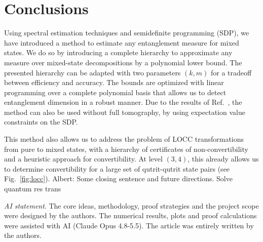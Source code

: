 \documentclass[aps,pra,twocolumn,showpacs,superscriptaddress,groupedaddress]{revtex4-2}
\newcommand{\albert}[1]{{\color{blue} Albert: #1}}
\begin{document}

\section{Conclusions}
Using spectral estimation techniques and semidefinite programming (SDP), we have introduced a method to estimate any entanglement measure for mixed states. We do so by introducing a complete hierarchy to approximate any measure over mixed-state decompositions by a polynomial lower bound. The presented hierarchy can be adapted with two parameters $(k,m)$ for a tradeoff between efficiency and accuracy. The bounds are optimized with linear programming over a complete polynomial basis that allows us to detect entanglement dimension in a robust manner. Due to the results of Ref.~\cite{Toth2015CroofTP}, the method can also be used without full tomography, by using expectation value constraints on the SDP.

This method also allows us to address the problem of LOCC transformations from pure to mixed states, with a hierarchy of certificates of non-convertibility and a heuristic approach for convertibility. At level $(3,4)$, this already allows us to determine convertibility for a large set of qutrit-qutrit state pairs (see Fig.~\ref{fig:locc}). \albert{Some closing sentence and future directions. Solve quantum res trans}

{\em AI statement}. 
The core ideas, methodology,
proof strategies and the project scope
were designed by the authors. 
The numerical results, plots and proof calculations were assisted with AI (Claude Opus 4.8-5.5). The article was entirely written by the authors.
\end{document}
